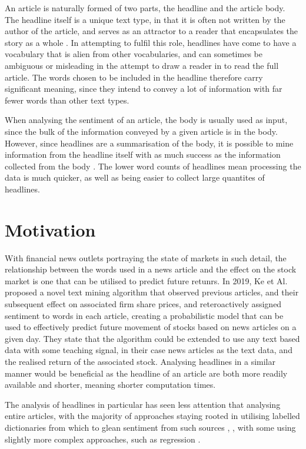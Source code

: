 An article is naturally formed of two parts, the headline and the article body. The headline itself is a unique text type, in that it is often not written by the author of the article, and serves as an attractor to a reader that encapsulates the story as a whole \parencite{language-newspapers}. In attempting to fulfil this role, headlines have come to have a vocabulary that is alien from other vocabularies, and can sometimes be ambiguous or misleading in the attempt to draw a reader in to read the full article. The words chosen to be included in the headline therefore carry significant meaning, since they intend to convey a lot of information with far fewer words than other text types.

When analysing the sentiment of an article, the body is usually used as input, since the bulk of the information conveyed by a given article is in the body. However, since headlines are a summarisation of the body, it is possible to mine information from the headline itself with as much success as the information collected from the body \parencite{kirange2016sentiment}. The lower word counts of headlines mean processing the data is much quicker, as well as being easier to collect large quantites of headlines.

\section{Motivation}
\label{sec:motivation}
With financial news outlets portraying the state of markets in such detail, the relationship between the words used in a news article and the effect on the stock market is one that can be utilised to predict future retunrs. In 2019, Ke et Al. \parencite{sestm} proposed a novel text mining algorithm that observed previous articles, and their subsequent effect on associated firm share prices, and reteroactively assigned sentiment to words in each article, creating a probabilistic model that can be used to effectively predict future movement of stocks based on news articles on a given day. They state that the algorithm could be extended to use any text based data with some teaching signal, in their case news articles as the text data, and the realised return of the associated stock. Analysing headlines in a similar manner would be beneficial as the headline of an article are both more readily available and shorter, meaning shorter computation times.

The analysis of headlines in particular has seen less attention that analysing entire articles, with the majority of approaches staying rooted in utilising labelled dictionaries from which to glean sentiment from such sources \parencite{kirange2016sentiment}, \parencite{nemes-prediction}, with some using slightly more complex approaches, such as regression \parencite{john2017sentiment}.

